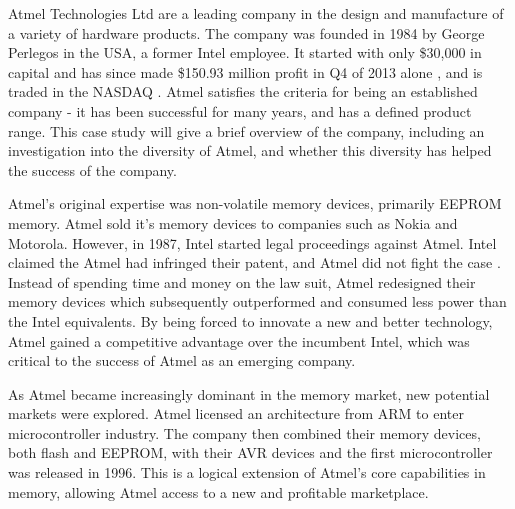 {}

Atmel Technologies Ltd are a leading company in the design and manufacture of a variety of hardware products. 
The company was founded in 1984 by George Perlegos in the USA, a former Intel employee. 
It started with only \$30,000 in capital \cite{atmel:capital} and has since made \$150.93 million profit in Q4 of 2013 alone \cite{atmel:profit}, and is traded in the NASDAQ \cite{atmel:nasdaq}.
Atmel satisfies the criteria for being an established company - it has been successful for many years, and has a defined product range.
This case study will give a brief overview of the company, including an investigation into the diversity of Atmel, and whether this diversity has helped the success of the company.



Atmel's original expertise was non-volatile memory devices, primarily EEPROM memory.
Atmel sold it's memory devices to companies such as Nokia and Motorola.
However, in 1987, Intel started legal proceedings against Atmel.
Intel claimed the Atmel had infringed their patent, and Atmel did not fight the case \cite{atmel:intel}.
Instead of spending time and money on the law suit, Atmel redesigned their memory devices which subsequently outperformed and consumed less power than the Intel equivalents.
By being forced to innovate a new and better technology, Atmel gained a competitive advantage over the incumbent Intel, which was critical to the success of Atmel as an emerging company.


As Atmel became increasingly dominant in the memory market, new potential markets were explored.
Atmel licensed an architecture from ARM to enter microcontroller industry.
The company then combined their memory devices, both flash and EEPROM, with their AVR devices and the first microcontroller was released in 1996.
This is a logical extension of Atmel's core capabilities in memory, allowing Atmel access to a new and profitable marketplace.


